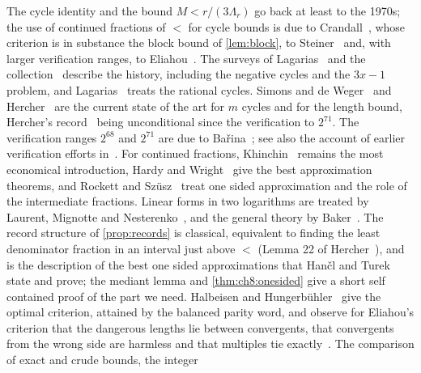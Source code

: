 The cycle identity and the bound $M<r/(3\Lambda_r)$ go back at least to the
1970s; the use of continued fractions of $\lt$ for cycle bounds is due to
Crandall~\cite{crandall1978}, whose criterion is in substance the block bound of \cref{lem:block}, to
Steiner~\cite{steiner1977} and, with larger verification ranges, to
Eliahou~\cite{eliahou1993}. The surveys of Lagarias~\cite{lagarias1985} and
the collection~\cite{lagarias2010} describe the history, including the
negative cycles and the $3x-1$ problem, and Lagarias~\cite{lagarias1990}
treats the rational cycles. Simons and de Weger~\cite{simons2005} and
Hercher~\cite{hercher2023} are the current state of the art for $m$ cycles
and for the length bound, Hercher's record~\cite[Corollary~29]{hercher2023} being unconditional since the verification to $2^{71}$. The verification ranges $2^{68}$ and $2^{71}$ are due to
Ba\v{r}ina~\cite{barina2021,barina2025}; see also the account of earlier verification
efforts in~\cite{lagarias2010}. For continued fractions,
Khinchin~\cite{khinchin1964} remains the most economical introduction, Hardy
and Wright~\cite{hardywright2008} give the best approximation theorems, and
Rockett and Sz\"usz~\cite{rockett1992} treat one sided approximation and the
role of the intermediate fractions. Linear forms in two logarithms are treated
by Laurent, Mignotte and Nesterenko~\cite{laurent1995}, and the general theory
by Baker~\cite{baker1975}. The record structure of \cref{prop:records} is classical, equivalent to finding
the least denominator fraction in an interval just above $\lt$ (Lemma 22 of
Hercher~\cite{hercher2023}), and is the description of the best one sided approximations that Han\v{c}l and Turek~\cite[Theorem~4.5(ii)]{hancl2019} state and prove; the mediant lemma and \cref{thm:ch8:onesided} give a short self contained proof of the
part we need. Halbeisen and Hungerb\"uhler~\cite{halbeisen1997} give the optimal criterion, attained by the balanced parity word, and observe for Eliahou's criterion that the dangerous lengths lie between convergents, that convergents from the wrong side are harmless and that multiples tie exactly~\cite[\S4.4]{halbeisen1997}. The comparison of exact and crude bounds, the integer
